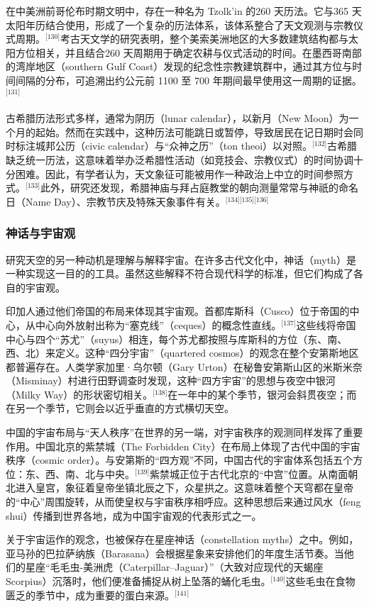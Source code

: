 在中美洲前哥伦布时期文明中，存在一种名为 Tzolk’in 的260 天历法。它与365 天太阳年历结合使用，形成了一个复杂的历法体系，该体系整合了天文观测与宗教仪式周期。\(^\text{[130]}\)考古天文学的研究表明，整个美索美洲地区的大多数建筑结构都与太阳方位相关，并且结合260 天周期用于确定农耕与仪式活动的时间。在墨西哥南部的湾岸地区（southern Gulf Coast）发现的纪念性宗教建筑群中，通过其方位与时间间隔的分布，可追溯出约公元前 1100 至 700 年期间最早使用这一周期的证据。\(^\text{[131]}\)

古希腊历法形式多样，通常为阴历（lunar calendar），以新月（New Moon）为一个月的起始。然而在实践中，这种历法可能跳日或暂停，导致居民在记日期时会同时标注城邦公历（civic calendar）与“众神之历”（ton theoi）以对照。\(^\text{[132]}\)古希腊缺乏统一历法，这意味着举办泛希腊性活动（如竞技会、宗教仪式）的时间协调十分困难。因此，有学者认为，天文象征可能被用作一种政治上中立的时间参照方式。\(^\text{[133]}\)此外，研究还发现，希腊神庙与拜占庭教堂的朝向测量常常与神祇的命名日（Name Day）、宗教节庆及特殊天象事件有关。\(^\text{[134][135][136]}\)
\subsubsection{神话与宇宙观}
研究天空的另一种动机是理解与解释宇宙。在许多古代文化中，神话（myth）是一种实现这一目的的工具。虽然这些解释不符合现代科学的标准，但它们构成了各自的宇宙观。

印加人通过他们帝国的布局来体现其宇宙观。首都库斯科（Cusco）位于帝国的中心，从中心向外放射出称为“塞克线”（ceques）的概念性直线。\(^\text{[137]}\)这些线将帝国中心与四个“苏尤”（suyus）相连，每个苏尤都按照与库斯科的方位（东、南、西、北）来定义。这种“四分宇宙”（quartered cosmos）的观念在整个安第斯地区都普遍存在。人类学家加里·乌尔顿（Gary Urton）在秘鲁安第斯山区的米斯米奈（Misminay）村进行田野调查时发现，这种“四方宇宙”的思想与夜空中银河（Milky Way）的形状密切相关。\(^\text{[138]}\)在一年中的某个季节，银河会斜贯夜空；而在另一个季节，它则会以近乎垂直的方式横切天空。

中国的宇宙布局与“天人秩序”在世界的另一端，对宇宙秩序的观测同样发挥了重要作用。中国北京的紫禁城（The Forbidden City）在布局上体现了古代中国的宇宙秩序（cosmic order）。与安第斯的“四方观”不同，中国古代的宇宙体系包括五个方位：东、西、南、北与中央。\(^\text{[139]}\)紫禁城正位于古代北京的“中宫”位置。从南面朝北进入皇宫，象征着皇帝坐镇北辰之下，众星拱之。这意味着整个天穹都在皇帝的“中心”周围旋转，从而使皇权与宇宙秩序相呼应。这种思想后来通过风水（feng shui）传播到世界各地，成为中国宇宙观的代表形式之一。

关于宇宙运作的观念，也被保存在星座神话（constellation myths）之中。例如，亚马孙的巴拉萨纳族（Barasana）会根据星象来安排他们的年度生活节奏。当他们的星座“毛毛虫-美洲虎（Caterpillar–Jaguar）”（大致对应现代的天蝎座 Scorpius）沉落时，他们便准备捕捉从树上坠落的蛹化毛虫。\(^\text{[140]}\)这些毛虫在食物匮乏的季节中，成为重要的蛋白来源。\(^\text{[141]}\)

